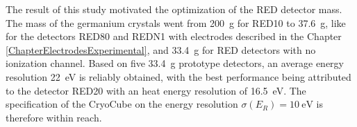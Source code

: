 The result of this study motivated the optimization of the RED detector mass. The mass of the germanium crystals went from \SI{200}{\g} for RED10 to \SI{37.6}{\g}, like for the detectors RED80 and REDN1 with electrodes described in the Chapter \ref{ChapterElectrodesExperimental}, and \SI{33.4}{\g} for RED detectors with no ionization channel. 
Based on five \SI{33.4}{\g} prototype detectors, an average energy resolution \SI{22}{\eV} is reliably obtained, with the best performance being attributed to the detector RED20 \cite{Armengaud:2019kfj} with an heat energy resolution of \SI{16.5}{\eV}. The specification of the CryoCube on the energy resolution $\sigma(E_R) = \SI{10}{\eV}$ is therefore within reach.

%

